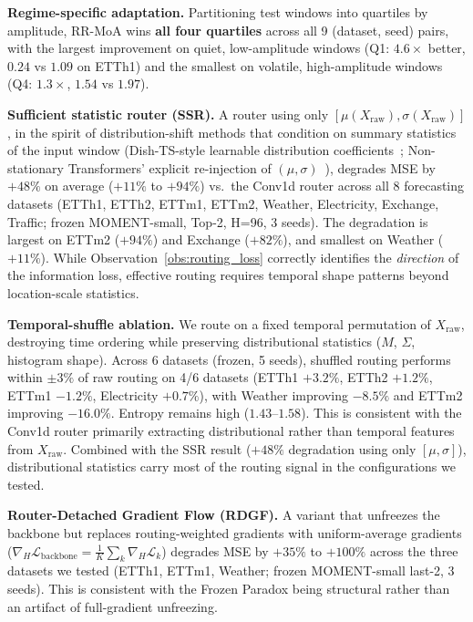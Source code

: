 \documentclass{article}
\begin{document}
\textbf{Regime-specific adaptation.} Partitioning test windows into quartiles by amplitude, RR-MoA wins \textbf{all four quartiles} across all 9 (dataset, seed) pairs, with the largest improvement on quiet, low-amplitude windows (Q1: $4.6{\times}$ better, $0.24$ vs $1.09$ on ETTh1) and the smallest on volatile, high-amplitude windows (Q4: $1.3{\times}$, $1.54$ vs $1.97$).

\textbf{Sufficient statistic router (SSR).} A router using only $[\mu(X_\text{raw}), \sigma(X_\text{raw})]$, in the spirit of distribution-shift methods that condition on summary statistics of the input window (Dish-TS-style learnable distribution coefficients~\citep{fan2023dishts}; Non-stationary Transformers' explicit re-injection of $(\mu,\sigma)$~\citep{liu2022nonstationary}), degrades MSE by $+48\%$ on average ($+11\%$ to $+94\%$) vs.\ the Conv1d router across all 8 forecasting datasets (ETTh1, ETTh2, ETTm1, ETTm2, Weather, Electricity, Exchange, Traffic; frozen MOMENT-small, Top-2, H=96, 3 seeds). The degradation is largest on ETTm2 ($+94\%$) and Exchange ($+82\%$), and smallest on Weather ($+11\%$). While Observation~\ref{obs:routing_loss} correctly identifies the \emph{direction} of the information loss, effective routing requires temporal shape patterns beyond location-scale statistics.

\textbf{Temporal-shuffle ablation.} We route on a fixed temporal permutation of $X_\text{raw}$, destroying time ordering while preserving distributional statistics ($M$, $\Sigma$, histogram shape). Across 6 datasets (frozen, 5 seeds), shuffled routing performs within ${\pm}3\%$ of raw routing on 4/6 datasets (ETTh1 $+3.2\%$, ETTh2 $+1.2\%$, ETTm1 $-1.2\%$, Electricity $+0.7\%$), with Weather improving $-8.5\%$ and ETTm2 improving $-16.0\%$. Entropy remains high ($1.43$--$1.58$). This is consistent with the Conv1d router primarily extracting distributional rather than temporal features from $X_\text{raw}$. Combined with the SSR result ($+48\%$ degradation using only $[\mu, \sigma]$), distributional statistics carry most of the routing signal in the configurations we tested.

\textbf{Router-Detached Gradient Flow (RDGF).} A variant that unfreezes the backbone but replaces routing-weighted gradients with uniform-average gradients ($\nabla_H \mathcal{L}_\text{backbone} = \frac{1}{K}\sum_k \nabla_H \mathcal{L}_k$) degrades MSE by $+35\%$ to $+100\%$ across the three datasets we tested (ETTh1, ETTm1, Weather; frozen MOMENT-small last-2, 3 seeds). This is consistent with the Frozen Paradox being structural rather than an artifact of full-gradient unfreezing.
\end{document}
